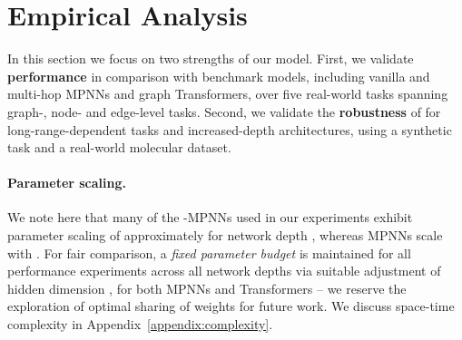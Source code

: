 \documentclass{article}
\theoremstyle{plain}
\theoremstyle{definition}
\theoremstyle{remark}
\begin{document}
\section{Empirical Analysis}
\label{sec:experiments}
In this section we focus on two strengths of our model. First, we validate \textbf{performance} in comparison with benchmark models, including vanilla and multi-hop MPNNs and graph Transformers, over five real-world tasks spanning graph-, node- and edge-level tasks. Second, we validate the \textbf{robustness} of  for long-range-dependent tasks and increased-depth architectures, using a synthetic task and a real-world molecular dataset. 


\vspace{-1mm}

\paragraph{Parameter scaling.} We note here that many of the -MPNNs used in our experiments exhibit parameter scaling of approximately  for network depth , whereas MPNNs scale with . For fair comparison, a {\em fixed parameter budget} is maintained for all performance experiments across all network depths via suitable adjustment of hidden dimension , for both MPNNs and Transformers -- we reserve the exploration of optimal sharing of weights for future work. We discuss space-time complexity in Appendix~\ref{appendix:complexity}.
\end{document}
